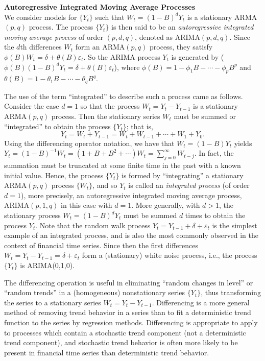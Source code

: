 \noindent\textbf{Autoregressive Integrated Moving Average Processes} \\


We consider models for $\{Y_t\}$ such that $W_t = (1 - B)^d Y_t$ is a stationary ARMA$(p,q)$ process. The process $\{Y_t\}$ is then said to be an \textit{autoregressive integrated moving average process} of order $(p,d,q)$, denoted as ARIMA$(p,d,q)$. Since the $d$th differences $W_t$ form an ARMA$(p,q)$ process, they satisfy $\phi(B)W_t = \delta + \theta(B)\varepsilon_t$. So the ARIMA process $Y_t$ is generated by ($\phi(B)(1 - B)^dY_t = \delta + \theta(B)\varepsilon_t$), where $\phi(B) = 1 - \phi_1B - \cdots - \phi_pB^p$ and $\theta(B) = 1 - \theta_1B - \cdots - \theta_qB^q$.


The use of the term ``integrated'' to describe such a process came as follows. Consider the case $d=1$ so that the process $W_t = Y_t - Y_{t-1}$ is a stationary ARMA$(p,q)$ process. Then the stationary series $W_t$ must be summed or ``integrated'' to obtain the process $\{Y_t\}$; that is,
	\[
	Y_t = W_t + Y_{t-1} = W_t + W_{t-1} + \cdots + W_1 + Y_0.
	\]
Using the differencing operator notation, we have that $W_t = (1 - B)Y_t$ yields $Y_t = (1 - B)^{-1}W_t = (1 + B + B^2 + \cdots)W_t = \sum_{j=0}^\infty W_{t-j}$. In fact, the summation must be truncated at some finite time in the past with a known initial value. Hence, the process $\{Y_t\}$ is formed by ``integrating'' a stationary ARMA$(p,q)$ process $\{W_t\}$, and so $Y_t$ is called an \textit{integrated process} (of order $d=1$), more precisely, an autoregressive integrated moving average process, ARIMA$(p,1,q)$ in this case with $d=1$. More generally, with $d>1$, the stationary process $W_t = (1 - B)^dY_t$ must be summed $d$ times to obtain the process $Y_t$. Note that the random walk process $Y_t = Y_{t-1} + \delta + \varepsilon_t$ is the simplest example of an integrated process, and is also the most commonly observed in the context of financial time series. Since then the first differences $W_t = Y_t - Y_{t-1} = \delta + \varepsilon_t$ form a (stationary) white noise process, i.e., the process $\{Y_t\}$ is ARIMA(0,1,0).


The differencing operation is useful in eliminating ``random changes in level'' or ``random trends'' in a (homogeneous) nonstationary series $\{Y_t\}$, thus transforming the series to a stationary series $W_t = Y_t - Y_{t-1}$. Differencing is a more general method of removing trend behavior in a series than to fit a deterministic trend function to the series by regression methods. Differencing is appropriate to apply to processes which contain a stochastic trend component (not a deterministic trend component), and stochastic trend behavior is often more likely to be present in financial time series than deterministic trend behavior.



